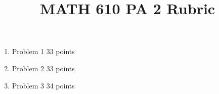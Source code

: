 \documentclass{article}
\title{MATH 610 PA 2 Rubric}
\author{}
\date{}
\begin{document}
\maketitle

\begin{enumerate}
	\item Problem 1 33 points
	\item Problem 2 33 points
	\item Problem 3 34 points
\end{enumerate}
\end{document}

